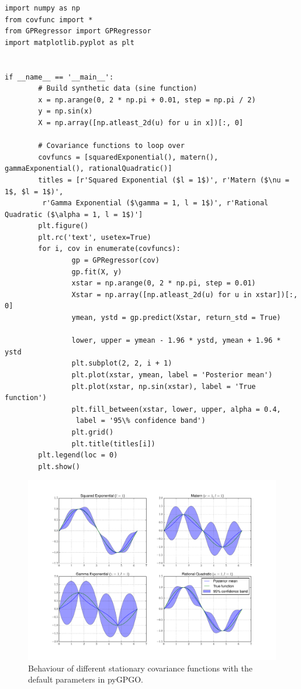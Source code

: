 \documentclass[10pt,a4paper,twoside]{book}
\begin{document}
\begin{verbatim}
import numpy as np
from covfunc import *
from GPRegressor import GPRegressor
import matplotlib.pyplot as plt


if __name__ == '__main__':
        # Build synthetic data (sine function)
        x = np.arange(0, 2 * np.pi + 0.01, step = np.pi / 2)
        y = np.sin(x)
        X = np.array([np.atleast_2d(u) for u in x])[:, 0]

        # Covariance functions to loop over
        covfuncs = [squaredExponential(), matern(), gammaExponential(), rationalQuadratic()]
        titles = [r'Squared Exponential ($l = 1$)', r'Matern ($\nu = 1$, $l = 1$)',
         r'Gamma Exponential ($\gamma = 1, l = 1$)', r'Rational Quadratic ($\alpha = 1, l = 1$)']
        plt.figure()
        plt.rc('text', usetex=True)
        for i, cov in enumerate(covfuncs):
                gp = GPRegressor(cov)
                gp.fit(X, y)
                xstar = np.arange(0, 2 * np.pi, step = 0.01)
                Xstar = np.array([np.atleast_2d(u) for u in xstar])[:, 0]
                ymean, ystd = gp.predict(Xstar, return_std = True)
                
                lower, upper = ymean - 1.96 * ystd, ymean + 1.96 * ystd
                plt.subplot(2, 2, i + 1)
                plt.plot(xstar, ymean, label = 'Posterior mean')
                plt.plot(xstar, np.sin(xstar), label = 'True function')
                plt.fill_between(xstar, lower, upper, alpha = 0.4,
                 label = '95\% confidence band')
                plt.grid()
                plt.title(titles[i])
        plt.legend(loc = 0)
        plt.show()
\end{verbatim}

\begin{figure}
\caption{Behaviour of different stationary covariance functions with the default parameters in pyGPGO.}
\label{fig:zoo}
\includegraphics[width=\textwidth]{figures/chapter2/zoo}
\end{figure}
\end{document}
